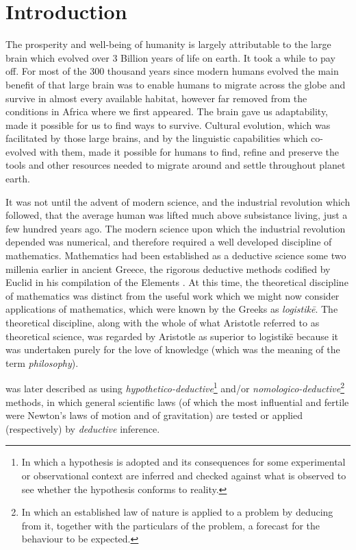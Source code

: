 \documentclass[10pt,titlepage]{book}
\begin{document}
\chapter{Introduction}

The prosperity and well-being of humanity is largely attributable to the large brain which evolved over 3 Billion years of life on earth.
It took a while to pay off.
For most of the 300 thousand years since modern humans evolved the main benefit of that large brain was to enable humans to migrate across the globe and survive in almost every available habitat, however far removed from the conditions in Africa where we first appeared.
The brain gave us adaptability, made it possible for us to find ways to survive.
Cultural evolution, which was facilitated by those large brains, and by the linguistic capabilities which co-evolved with them, made it possible for humans to find, refine and preserve the tools and other resources needed to migrate around and settle throughout planet earth.

It was not until the advent of modern science, and the industrial revolution which followed, that the average human was lifted much above subsistance living, just a few hundred years ago.
The modern science upon which the industrial revolution depended was numerical, and therefore required a well developed discipline of mathematics.
Mathematics had been established as a deductive science some two millenia earlier in ancient Greece, the rigorous deductive methods codified by Euclid in his compilation of the Elements \cite{euclidEL1}.
At this time, the theoretical discipline of mathematics was distinct from the useful work which we might now consider applications of mathematics, which were known by the Greeks as \emph{logistikē}.
The theoretical discipline, along with the whole of what Aristotle referred to as theoretical science, was regarded by Aristotle as superior to logistikē because it was undertaken purely for the love of knowledge (which was the meaning of the term \emph{philosophy}).

was later described as using \emph{hypothetico-deductive}\footnote{In which a hypothesis is adopted and its consequences for some experimental or observational context are inferred and checked against what is observed to see whether the hypothesis conforms to reality.} and/or \emph{nomologico-deductive}\footnote{In which an established law of nature is applied to a problem by deducing from it, together with the particulars of the problem, a forecast for the behaviour to be expected.} methods, in which general scientific laws (of which the most influential and fertile were Newton's laws of motion and of gravitation) are tested or applied (respectively) by \emph{deductive} inference.
\end{document}
